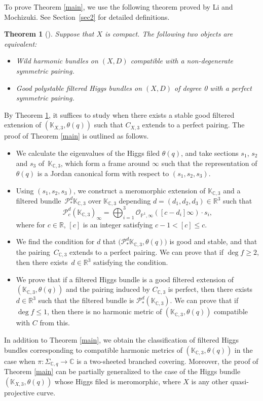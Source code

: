 \documentclass[pdftex]{sigma}
\numberwithin{equation}{section}
\newtheorem{Theorem}{Theorem}[section]
\newcommand{\C}{\mathbb{C}}
\newcommand{\R}{\mathbb{R}}
\newcommand{\ps}{\mathbb{P}}
\newcommand{\strsheaf}{\mathcal{O}}
\begin{document}
To prove Theorem \ref{main}, we use the following theorem proved by Li and Mochizuki. See Section~\ref{sec2} for detailed definitions.
\begin{Theorem}[\cite{LM1}]\label{correspond}
 Suppose that $X$ is compact. The following two objects are equivalent:
 \begin{itemize}\itemsep=0pt
 \item Wild harmonic bundles on $(X,D)$ compatible with a non-degenerate symmetric pairing.
 \item Good polystable filtered Higgs bundles on $(X,D)$ of degree 0 with a perfect symmetric pairing.
 \end{itemize}
\end{Theorem}
By Theorem \ref{correspond}, it suffices to study when there exists a stable good filtered extension of $(\mathbb{K}_{X,3},\theta(q))$ such that $C_{X,3}$ extends to a perfect pairing. The proof of Theorem \ref{main} is outlined as follows.
\begin{itemize}\itemsep=0pt\setlength{\leftskip}{0.46cm}
 \item[{\bf Step 1}] We calculate the eigenvalues of the Higgs filed $\theta(q)$, and take sections $s_1$, $s_2$ and $s_3$ of~$\mathbb{K}_{\C,3}$, which form a frame around $\infty$ such that the representation of $\theta(q)$ is
 a Jordan canonical form with respect to $(s_1,s_2,s_3)$.
 \item[{\bf Step 2}] Using $(s_1,s_2,s_3)$, we construct a meromorphic extension of $\mathbb{K}_{\C,3}$ and a filtered bundle~$\mathcal{P}^{d}_{*}\mathbb{K}_{\C,3}$ over $\mathbb{K}_{\C,3}$ depending $d=(d_1,d_2,d_3)\in \R^3$ such that
 \begin{equation*}
 \mathcal{P}^{d}_{c}(\mathbb{K}_{\C,3})_{\infty} = \bigoplus_{i=1}^3\strsheaf_{\ps^1,\infty}([c-d_i]\infty)\cdot s_i,
 \end{equation*}
 where for $c\in\R$, $[c]$ is an integer satisfying $c-1<[c]\leq c$.
 \item[{\bf Step 3}] We find the condition for $d$ that $\bigl(\mathcal{P}^{d}_{*}\mathbb{K}_{\C,3},\theta(q)\bigr)$ is good and stable, and that the pairing~$C_{\C,3}$ extends to a perfect pairing. We can prove that if $\deg{f}\geq 2$, then there exists~$d\in\R^3$ satisfying the condition.
 \item[{\bf Step 4}] We prove that if a filtered Higgs bundle is a good filtered extension of $(\mathbb{K}_{\C,3},\theta(q))$ and the pairing induced by $C_{\C,3}$ is perfect, then there exists $d\in\R^3$ such that the filtered bundle is $\mathcal{P}^{d}_{*}(\mathbb{K}_{\C,3})$. We can prove that if $\deg{f}\leq 1$, then there is no harmonic metric of $(\mathbb{K}_{\C,3},\theta(q))$ compatible with $C$ from this.
\end{itemize}
In addition to Theorem \ref{main}, we obtain the classification of filtered Higgs bundles corresponding to compatible harmonic metrics of $(\mathbb{K}_{\C,3},\theta(q))$ in the case when $\pi\colon \Sigma_{\C,q}\to \C$ is a two-sheeted branched covering.
Moreover, the proof of Theorem \ref{main} can be partially generalized to the case of the Higgs bundle $(\mathbb{K}_{X,3},\theta(q))$ whose Higgs filed is meromorphic, where $X$ is any other quasi-projective curve.
\end{document}
